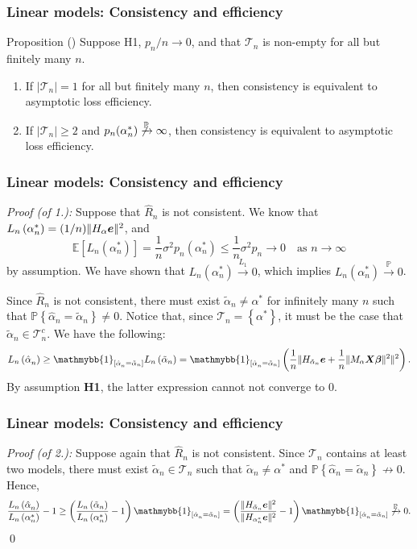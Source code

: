 \documentclass{beamer}
\newcommand{\0}{\emptyset}
\newcommand{\prob}{\mathbb{P}}
\newcommand{\Ep}[1]{\mathbb{E}\left[ #1 \right]}
\newcommand{\paren}[1]{\left(#1 \right)}
\newcommand{\sqbr}[1]{\left[#1 \right]}
\newcommand{\set}[1]{\left\{ #1 \right\}}
\newcommand{\norm}[1]{|\hspace{-1pt}|#1 |\hspace{-1pt}|}
\newcommand{\normsq}[1]{\norm{#1}^{2}}
\newcommand{\ind}[1]{\mathmybb{1}_{\sqbr{#1}}}
\newcommand{\Tcal}{\mathcal{T}_{n}}
\newcommand{\X}{\boldsymbol{X}}
\newcommand{\e}{\boldsymbol{e}}
\newcommand{\bbeta}{\boldsymbol{\beta}}
\newcommand{\Loss}[1]{L_{n}\paren{#1}}
\newcommand{\alphahat}[1]{\hat{\alpha}^{#1}}
\newcommand{\alphatilde}{\tilde{\alpha}}
\newcommand{\1}{\mathmybb{1}}
\begin{document}
\begin{frame}
  \frametitle{Linear models: Consistency and efficiency}
  \begin{block}{Proposition (\cite{shao_1997})}
    Suppose H1, \(p_{n}/n\to 0\), and that \(\Tcal\) is non-empty for all but finitely many \(n\).
    \begin{enumerate}
        \item If \(|\Tcal|=1\) for all but finitely many \(n\), then consistency is equivalent to asymptotic loss efficiency.
        \item If \(|\Tcal|\geq 2\) and \(p_{n}(\alpha^{*}_{n})\not\xrightarrow{\prob}\infty\), then consistency is equivalent to asymptotic loss efficiency.
    \end{enumerate}
  \end{block}

\end{frame}

\begin{frame}
  \frametitle{Linear models: Consistency and efficiency}
  \textit{Proof (of 1.): } Suppose that \(\hat{R}_{n}\) is not consistent. We know that \(\Loss{\alpha^{*}_{n}} = (1/n)\normsq{H_{\alpha}\e}\), and
  \[\Ep{\Loss{\alpha^{*}_{n}}} = \frac{1}{n}\sigma^{2}p_{n}(\alpha^{*}_{n})\leq \frac{1}{n}\sigma^{2}p_{n}\to 0 \quad\text{as }n\to\infty\]
  by assumption. We have shown that \(\Loss{\alpha^{*}_{n}}\xrightarrow{L_{1}} 0\), which implies \(\Loss{\alpha^{*}_{n}}\xrightarrow{\prob} 0\).

  Since \(\hat{R}_{n}\) is not consistent, there must exist \(\alphatilde_{n}\neq\alpha^{*}\) for infinitely many \(n\) such that \(\prob\set{\alphahat{}_{n} = \alphatilde_{n}} \neq 0\). Notice that, since \(\Tcal=\set{\alpha^{*}}\), it must be the case that \(\alphatilde_{n}\in\Tcal^{c}\). We have the following:
  \[\Loss{\alphahat{}_{n}}\geq \ind{\alphahat{}_{n} = \alphatilde_{n}}\Loss{\alphatilde_{n}} = \ind{\alphahat{}_{n} = \alphatilde_{n}}\paren{\frac{1}{n}\normsq{H_{\alphatilde_{n}}\e + \frac{1}{n}\normsq{M_{\alpha}\X\bbeta}}}.\]
  By assumption \textbf{H1}, the latter expression cannot not converge to 0.
\end{frame}

\begin{frame}
  \frametitle{Linear models: Consistency and efficiency}
  \textit{Proof (of 2.): } Suppose again that \(\hat{R}_{n}\) is not consistent. Since \(\Tcal\) contains at least two models, there must exist \(\alphatilde_{n}\in\Tcal\) such that \(\alphatilde_{n}\neq \alpha^{*}\) and \(\prob\set{\alphahat{}_{n} = \alphatilde_{n}}\not\to 0\). Hence,
  \[\frac{\Loss{\alphahat{}_{n}}}{\Loss{\alpha^{*}_{n}}} - 1 \geq \paren{\frac{\Loss{\alphatilde{}_{n}}}{\Loss{\alpha^{*}_{n}}} - 1}\ind{\alphahat{}_{n} = \alphatilde_{n}} = \paren{\frac{\normsq{H_{\alphatilde_{n}}\e}}{\normsq{H_{\alpha^{*}_{n}}\e}} - 1}\ind{\alphahat{}_{n} = \alphatilde_{n}}\not\xrightarrow{\prob}0.\]\qed{}
\end{frame}
\end{document}
